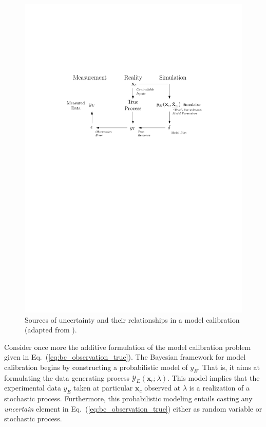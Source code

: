 \begin{figure}[bth]	
	\centering
	\includegraphics[width=1.0\textwidth]{../figures/chapter5/figures/HMErrorModel}
	\caption[Relationships between sources of uncertainty in a model calibration.]{Sources of uncertainty and their relationships in a model calibration (adapted from \cite{Huard2006}).}
	\label{fig:ch5_hm_error_model}
\end{figure}

Consider once more the additive formulation of the model calibration problem given in Eq.~(\ref{eq:bc_observation_true}).
The Bayesian framework for model calibration begins by constructing a probabilistic model of $y_E$. 
That is, it aims at formulating the data generating process $\mathcal{Y}_E(\bm{x}_c;\lambda)$.
This model implies that the experimental data $y_E$ taken at particular $\bm{x}_c$ observed at $\lambda$ is a realization of a stochastic process.
Furthermore, this probabilistic modeling entails casting any \emph{uncertain} element in Eq.~(\ref{eq:bc_observation_true}) either as random variable or stochastic process.

